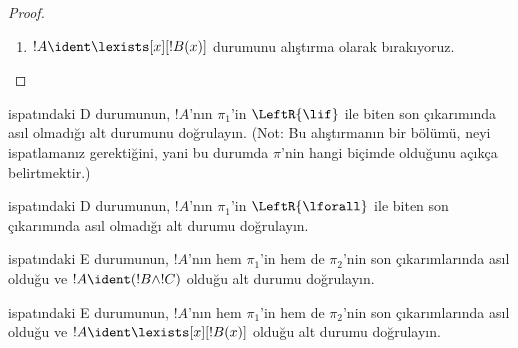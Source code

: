 \begin{proof}
\begin{enumerate}
!!{proof}~$\pi_1'$nün son-sekantı
$\Gamma \Sequent \Delta, !B(c)$'dir; burada $c$, bir
$\RightR{\lforall}$ çıkarımının özdeğişkenidir. Dolayısıyla $c$,
$!B(x)$, $\Gamma$ ya da~$\Delta$ içinde geçmez. !!{proof}~$\pi$'nin
düzenli olduğunu varsayarız; öyleyse $c$, yalnızca aşağıdaki
$\RightR{\lforall}$ çıkarımının özdeğişkenidir ve yalnızca onun üstünde,
yani yalnızca~$\pi_1'$ içinde geçer; ayrıca $\pi_1'$ içindeki bir
çıkarımın özdeğişkeni değildir. $c$, $\pi_2$ içinde geçmediği için
$t$ içinde de geçemez.  uyarınca
!!{proof}~$\Subst{\pi_1'}{t}{c}$,
$\Gamma \Sequent \Delta, !B(t)$'nin !!a{proof}{}ıdır. Şimdi tümevarım
varsayımını şu !!{proof}{}a uygularız:
\[
\AxiomC{}
\RightLabel{$\Subst{\pi_1'}{t}{c}$}
\Deduce$\Gamma \fCenter \Delta, !B(t)$
\AxiomC{}
\RightLabel{$\pi_2''$}
\Deduce$!B(t), \Gamma \fCenter \Delta$
\RightLabel{\CutCS}
\BinaryInf$\Gamma \fCenter \Delta$
\DisplayProof
\]
(Kesme !!{formula}{}ü~$!B(t)$ olduğu için tümevarım varsayımı uygulanır;
yani !!{proof}{}ın kesme derecesi~$\pi$'ninkinden düşüktür.)
\item $!A \ident \lexists[x][!B(x)]$ durumunu alıştırma olarak
bırakıyoruz.
\end{enumerate}
\end{proof}

\begin{prob}
 ispatındaki D durumunun, $!A$'nın
$\pi_1$'in $\LeftR{\lif}$ ile biten son çıkarımında asıl olmadığı alt
durumunu doğrulayın. (Not: Bu alıştırmanın bir bölümü, neyi
ispatlamanız gerektiğini, yani bu durumda $\pi$'nin hangi biçimde
olduğunu açıkça belirtmektir.)
\end{prob}

\begin{prob}
 ispatındaki D durumunun, $!A$'nın
$\pi_1$'in $\LeftR{\lforall}$ ile biten son çıkarımında asıl olmadığı
alt durumu doğrulayın.
\end{prob}

\begin{prob}
 ispatındaki E durumunun, $!A$'nın hem
$\pi_1$'in hem de $\pi_2$'nin son çıkarımlarında asıl olduğu ve
$!A \ident (!B \land !C)$ olduğu alt durumu doğrulayın.
\end{prob}

\begin{prob}
 ispatındaki E durumunun, $!A$'nın hem
$\pi_1$'in hem de $\pi_2$'nin son çıkarımlarında asıl olduğu ve
$!A \ident \lexists[x][!B(x)]$ olduğu alt durumu doğrulayın.
\end{prob}

